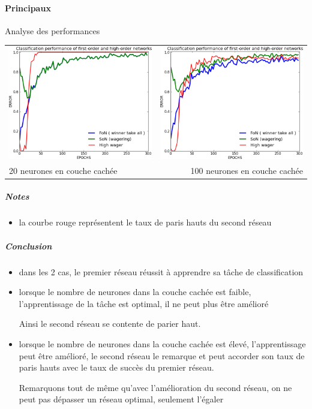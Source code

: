     \paragraph{Principaux}
      Analyse des performances
      \begin{center}
	\begin{tabular}{lr}
	  \hspace*{-1cm}
	  \includegraphics[width=250px]{data/expC2/perf_20.png}
	  &
	  \includegraphics[width=250px]{data/expC2/perf_100.png} \\
	  
	  20 neurones en couche cachée
	  &
	  \hspace*{-1cm}
	  100 neurones en couche cachée
	\end{tabular}
      \end{center}
      \subparagraph{Notes}
	\begin{itemize}
	  \item la courbe rouge représentent le taux de paris hauts du second réseau
	\end{itemize}
      \subparagraph{Conclusion}
	\begin{itemize}
	  \item dans les 2 cas, le premier réseau réussit à apprendre sa tâche de classification
	  \item lorsque le nombre de neurones dans la couche cachée est faible, l'apprentissage de la tâche est optimal, il ne peut plus être amélioré
	  
	  Ainsi le second réseau se contente de parier haut.
	  \item lorsque le nombre de neurones dans la couche cachée est élevé, l'apprentissage peut être amélioré, le second réseau 
	  le remarque et peut accorder son taux de paris hauts avec le taux de succès du premier réseau.
	  
	  Remarquons tout de même qu'avec l'amélioration du second réseau, on ne peut pas dépasser un réseau optimal, seulement l'égaler
	\end{itemize}
